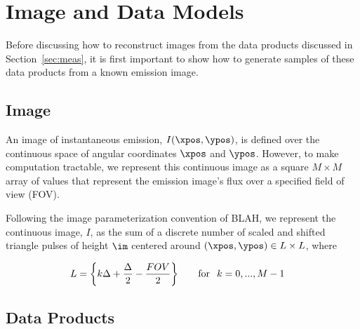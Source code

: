 

\section{Image and Data Models}
\label{sec:setup}

Before discussing how to reconstruct images from the data products discussed in Section~\ref{sec:meas}, it is first important to show how to generate samples of these data products from a known emission image.


\subsection{Image}

An image of instantaneous emission, $I(\xpos,\ypos)$, is defined over the continuous space of angular coordinates $\xpos$ and $\ypos$. However, to make computation tractable,
we represent this continuous image as a square $M \times M$ array of values that represent the emission image's flux over a specified field of view (FOV). 

Following the image parameterization convention of BLAH, we represent the continuous image, $I$, as the sum of a discrete number of scaled and shifted triangle pulses of height $\im$ centered around $(\xpos, \ypos) \in L \times L$, where

\begin{align}
L &=  \left \{ k \Delta + \frac{\Delta}{2}  -\frac{FOV}{2} \right \} \hspace{0.26in} \mbox{for} \hspace{0.1 in} k = 0,...,M-1
\label{eq:discrete1}
\end{align} 




\subsection{Data Products}
\label{sec:dataproducts}

